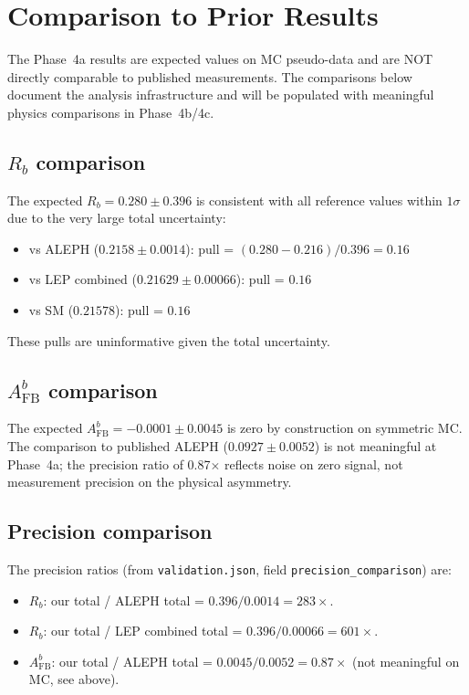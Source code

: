 \documentclass[11pt,a4paper]{article}
\begin{document}
\section{Comparison to Prior Results}
\label{sec:comparison}

The Phase~4a results are expected values on MC pseudo-data and are NOT directly
comparable to published measurements. The comparisons below document the analysis
infrastructure and will be populated with meaningful physics comparisons in
Phase~4b/4c.

\subsection{$R_b$ comparison}

The expected $R_b = 0.280 \pm 0.396$ is consistent with all reference values within
$1\sigma$ due to the very large total uncertainty:
\begin{itemize}
\item vs ALEPH ($0.2158 \pm 0.0014$): pull = $(0.280 - 0.216)/0.396 = 0.16$
\item vs LEP combined ($0.21629 \pm 0.00066$): pull = $0.16$
\item vs SM ($0.21578$): pull = $0.16$
\end{itemize}
These pulls are uninformative given the total uncertainty.

\subsection{$A_\mathrm{FB}^b$ comparison}

The expected $A_\mathrm{FB}^b = -0.0001 \pm 0.0045$ is zero by construction on
symmetric MC. The comparison to published ALEPH ($0.0927 \pm 0.0052$) is not meaningful
at Phase~4a; the precision ratio of 0.87$\times$ reflects noise on zero signal, not
measurement precision on the physical asymmetry.

\subsection{Precision comparison}
\label{sec:precision_comparison}

The precision ratios (from \texttt{validation.json}, field \texttt{precision\_comparison})
are:
\begin{itemize}
\item $R_b$: our total / ALEPH total = $0.396/0.0014 = 283\times$.
\item $R_b$: our total / LEP combined total = $0.396/0.00066 = 601\times$.
\item $A_\mathrm{FB}^b$: our total / ALEPH total = $0.0045/0.0052 = 0.87\times$
(not meaningful on MC, see above).
\end{itemize}
\end{document}
